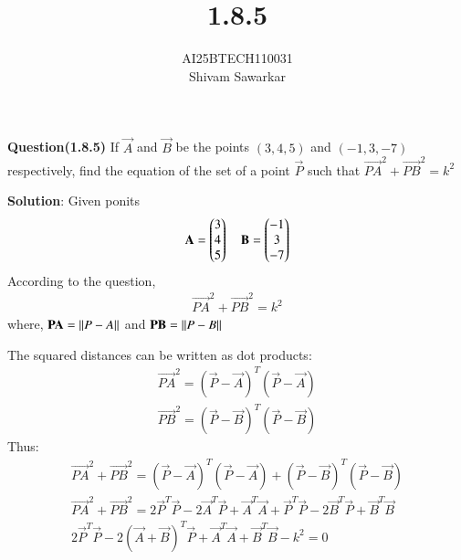 \documentclass[journal]{IEEEtran}
\begin{document}

\vspace{3cm}

\title{1.8.5}
\author{AI25BTECH110031 \\ Shivam Sawarkar}
 \maketitle
{\let\newpage\relax\maketitle}

\renewcommand{\thefigure}{\theenumi}
\renewcommand{\thetable}{\theenumi}
\setlength{\intextsep}{10pt} %


\renewcommand{\thetable}{\theenumi}

\textbf{Question(1.8.5)}
If $\vec{A}$ and $\vec{B}$ be the points $(3,4,5)$ and $(-1,3,-7)$ respectively, find the equation of the set of a point $\vec{P}$ such that $\vec{PA}^2+\vec{PB}^2=k^2$

\textbf{Solution}:
Given ponits 
\begin{align}
    \mathbf{A}=\begin{pmatrix}3 \\ 4 \\ 5\end{pmatrix} \quad \mathbf{B}=\begin{pmatrix}-1 \\ 3 \\ -7\end{pmatrix}
\end{align}
According to the question,  
\begin{align}
    \vec{PA}^2+\vec{PB}^2=k^2
\end{align}
where, $\mathbf{PA}=\left\lVert P-A\right\rVert$ and $\mathbf{PB}=\left\lVert P-B\right\rVert$

The squared distances can be written as dot products:
\begin{align}
    \vec{PA}^2=(\vec{P}-\vec{A})^T(\vec{P}-\vec{A}) \\
    \vec{PB}^2=(\vec{P}-\vec{B})^T(\vec{P}-\vec{B})
\end{align}
Thus:
\begin{align}
    \vec{PA}^2+\vec{PB}^2=(\vec{P}-\vec{A})^T(\vec{P}-\vec{A})+(\vec{P}-\vec{B})^T(\vec{P}-\vec{B}) \\
    \vec{PA}^2+\vec{PB}^2=2\vec{P}^T\vec{P}-2\vec{A}^T\vec{P}+\vec{A}^T\vec{A}+\vec{P}^T\vec{P}-2\vec{B}^T\vec{P}+\vec{B}^T\vec{B}\\ 
    2\vec{P}^T\vec{P}-2(\vec{A}+\vec{B})^T\vec{P}+\vec{A}^T\vec{A}+\vec{B}^T\vec{B}-k^2=0
\end{align}
\end{document}
